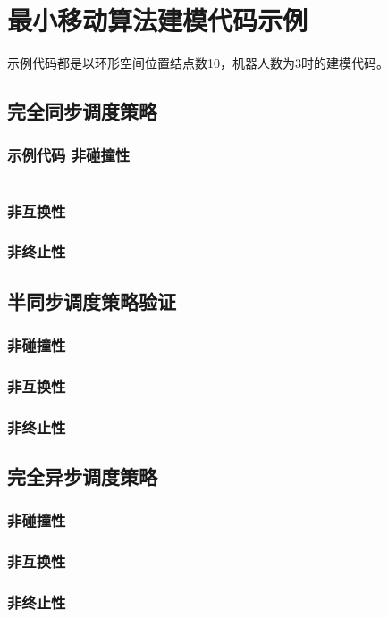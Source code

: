 \appendix{}

\chapter{最小移动算法建模代码示例}

示例代码都是以环形空间位置结点数10，机器人数为3时的建模代码。

\section{完全同步调度策略}

\subsection{示例代码  非碰撞性}

\begin{lstlisting}

\end{lstlisting}


\subsection{非互换性}

\subsection{非终止性}

\section{半同步调度策略验证}

\subsection{非碰撞性}

\subsection{非互换性}

\subsection{非终止性}

\section{完全异步调度策略}

\subsection{非碰撞性}

\subsection{非互换性}

\subsection{非终止性}